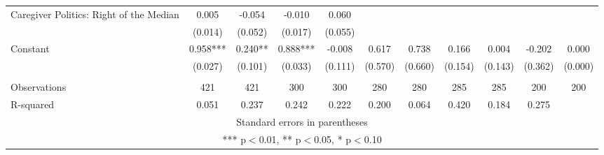 \begin{tabular}{lcccccccccc}
Caregiver Politics: Right of the Median & 0.005 & -0.054 & -0.010 & 0.060 &  &  &  &  &  &  \\
 & (0.014) & (0.052) & (0.017) & (0.055) &  &  &  &  &  &  \\
Constant & 0.958*** & 0.240** & 0.888*** & -0.008 & 0.617 & 0.738 & 0.166 & 0.004 & -0.202 & 0.000 \\
 & (0.027) & (0.101) & (0.033) & (0.111) & (0.570) & (0.660) & (0.154) & (0.143) & (0.362) & (0.000) \\
 &  &  &  &  &  &  &  &  &  &  \\
Observations & 421 & 421 & 300 & 300 & 280 & 280 & 285 & 285 & 200 & 200 \\
 R-squared & 0.051 & 0.237 & 0.242 & 0.222 & 0.200 & 0.064 & 0.420 & 0.184 & 0.275 &  \\ \hline
\multicolumn{11}{c}{ Standard errors in parentheses} \\
\multicolumn{11}{c}{ *** p$<$0.01, ** p$<$0.05, * p$<$0.10} \\
\end{tabular}
